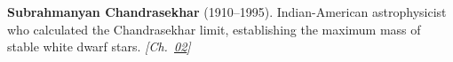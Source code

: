 \nobelphysics \textbf{Subrahmanyan Chandrasekhar} (1910–1995). Indian-American astrophysicist who calculated the Chandrasekhar limit, establishing the maximum mass of stable white dwarf stars. \emph{[Ch.~\hyperref[ch:acceleratinguniverse]{02}]}

